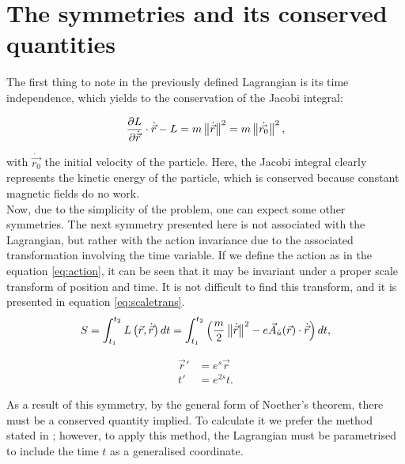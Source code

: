 \section{The symmetries and its conserved quantities}
The first thing to note in the previously defined Lagrangian is its time independence, which yields to the conservation of the Jacobi integral:

\begin{equation*}
 \frac{\partial L}{\partial\dot{\vec{r}}}\cdot\dot{\vec{r}} - L = m\left\lVert \dot{\vec{r}} \right\rVert^2                    =m\left\lVert \dot{\vec{r_0}} \right\rVert^2 ,
\end{equation*}

with $\dot{\vec{r_0}}$ the initial velocity of the particle. Here, the Jacobi integral clearly represents the kinetic energy of the particle, which is conserved because constant magnetic fields do no work.\\

Now, due to the simplicity of the problem, one can expect some other symmetries. The next symmetry presented here is not associated with the Lagrangian, but rather with the action invariance due to the associated transformation involving the time variable. If we define the action as in the equation \eqref{eq:action}, it can be seen that it may be invariant under a proper scale transform of position and time. It is not difficult to find this transform, and it is presented in equation \eqref{eq:scaletrans}.\\

\begin{equation}
S = \int_{t_1}^{t_2}L\left( \vec{r},\dot{\vec{r}} \right)dt = \int_{t_1}^{t_2}\left( \frac{m}{2}\left\lVert \dot{\vec{r}} \right\rVert^2 - e\vec{A}_{\hat{u}}(\vec{r})\cdot\dot{\vec{r}} \right)dt,
\label{eq:action}
\end{equation}

\begin{equation}
\begin{aligned}
\vec{r}' &= e^{s}\vec{r}\\
t'&= e^{2s}t.
\end{aligned}
\label{eq:scaletrans}
\end{equation}

As a result of this symmetry, by the general form of Noether's theorem, there must be a conserved quantity implied. To calculate it we prefer the method stated in \cite[2.19 Noether's Thm]{scheck}; however, to apply this method, the Lagrangian must be parametrised to include the time $t$ as a generalised coordinate.\\

